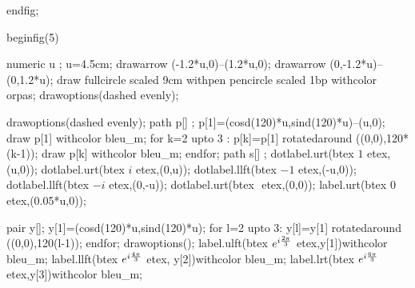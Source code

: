 \documentclass[12pt]{article}
\begin{document}
 endfig;

beginfig(5)



 numeric u ;
 u=4.5cm;
 drawarrow (-1.2*u,0)--(1.2*u,0);
 drawarrow (0,-1.2*u)--(0,1.2*u);
 draw fullcircle scaled 9cm withpen pencircle scaled 1bp withcolor orpas;
 drawoptions(dashed evenly);


  drawoptions(dashed evenly);
  path p[] ;
  p[1]=(cosd(120)*u,sind(120)*u)--(u,0);
  draw p[1] withcolor  bleu_m;
  for k=2 upto 3 : p[k]=p[1] rotatedaround ((0,0),120*(k-1));
    draw p[k] withcolor bleu_m;
  endfor;
  path s[] ;
dotlabel.urt(btex $1$ etex,(u,0));
dotlabel.urt(btex $i$ etex,(0,u));
dotlabel.llft(btex $-1$ etex,(-u,0));
dotlabel.llft(btex $-i$ etex,(0,-u));
dotlabel.urt(btex $ $ etex,(0,0));
label.urt(btex $0$ etex,(0.05*u,0));



  pair y[];
  y[1]=(cosd(120)*u,sind(120)*u);
  for l=2 upto 3:
    y[l]=y[1] rotatedaround ((0,0),120(l-1));
  endfor;
  drawoptions();
  label.ulft(btex $e^{i{2\pi \over 3}}$ etex,y[1])withcolor bleu_m;
  label.llft(btex $e^{i{4\pi \over 3}}$ etex, y[2])withcolor bleu_m;
  label.lrt(btex $e^{i{6\pi \over 3}}$ etex,y[3])withcolor bleu_m;
\end{document}
